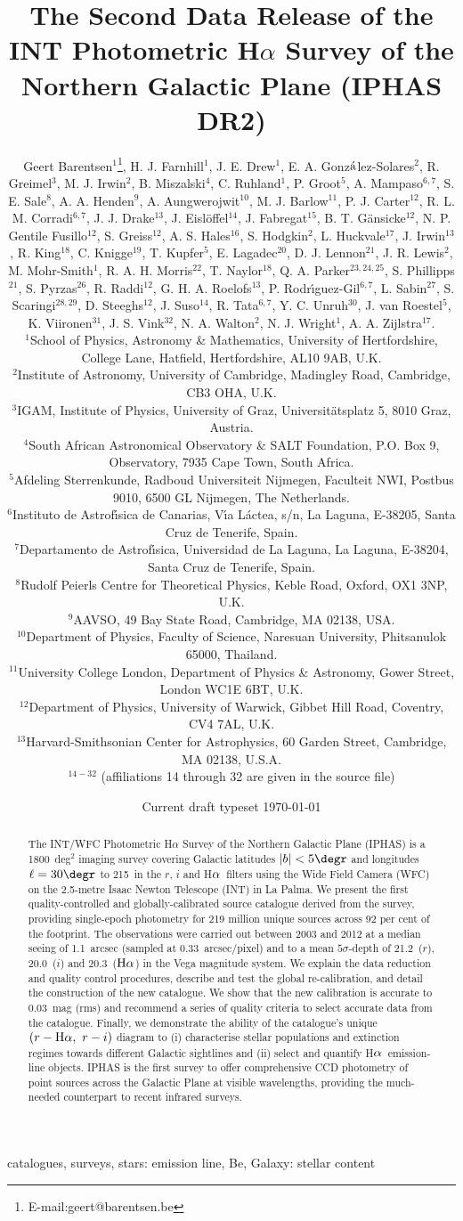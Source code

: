 \documentclass[a4paper,useAMS,usenatbib]{mn2e}
\title[IPHAS Data Release 2]{The Second Data Release 
of the INT Photometric H$\alpha$ Survey 
of the Northern Galactic Plane (IPHAS DR2)}
\author[G. Barentsen
et. al]{Geert Barentsen$^{1}$\thanks{E-mail:geert@barentsen.be},
H. J. Farnhill$^1$,
J. E. Drew$^1$,
E. A. Gonz$\acute{\rm{a}}$lez-Solares$^2$, \newauthor
R. Greimel$^3$, 
M. J. Irwin$^2$,
B. Miszalski$^{4}$,
C. Ruhland$^1$,
P. Groot$^5$,
A. Mampaso$^{6,7}$, \newauthor
S. E. Sale$^8$, 
A. A. Henden$^9$,
A. Aungwerojwit$^{10}$,
M. J. Barlow$^{11}$,
P. J. Carter$^{12}$, \newauthor
R. L. M. Corradi$^{6,7}$, 
J. J. Drake$^{13}$, 
J. Eisl\"offel$^{14}$, 
J. Fabregat$^{15}$, 
B. T. G\"ansicke$^{12}$, \newauthor
N. P. Gentile Fusillo$^{12}$, 
S. Greiss$^{12}$, 
A. S. Hales$^{16}$, 
S. Hodgkin$^2$,
L. Huckvale$^{17}$, \newauthor
J. Irwin$^{13}$,
R. King$^{18}$,
C. Knigge$^{19}$, 
T. Kupfer$^{5}$,
E. Lagadec$^{20}$,
D. J. Lennon$^{21}$, \newauthor
J. R. Lewis$^{2}$,
M. Mohr-Smith$^{1}$,
R. A. H. Morris$^{22}$, 
T. Naylor$^{18}$, 
Q. A. Parker$^{23,24,25}$,  \newauthor
S. Phillipps$^{21}$, 
S. Pyrzas$^{26}$,
R. Raddi$^{12}$,
G. H. A. Roelofs$^{13}$, 
P. Rodr\'\i guez-Gil$^{6,7}$, \newauthor
L. Sabin$^{27}$, 
S. Scaringi$^{28,29}$,
D. Steeghs$^{12}$,
J. Suso$^{14}$,
R. Tata$^{6,7}$,
Y. C. Unruh$^{30}$, \newauthor
J. van Roestel$^5$, 
K. Viironen$^{31}$, 
J. S. Vink$^{32}$, 
N. A. Walton$^{2}$, 
N. J. Wright$^{1}$, \newauthor
A. A. Zijlstra$^{17}$.
\\
$^{1}$School of Physics, Astronomy \& Mathematics, University of Hertfordshire, College Lane, Hatfield, Hertfordshire, AL10 9AB, U.K.\\
$^{2}$Institute of Astronomy, University of Cambridge, Madingley Road, Cambridge, CB3 OHA, U.K.\\
$^{3}$IGAM, Institute of Physics, University of Graz, Universit\"atsplatz 5, 8010 Graz, Austria.\\
$^{4}$South African Astronomical Observatory \& SALT Foundation, P.O. Box 9, Observatory, 7935 Cape Town, South Africa.\\
$^{5}$Afdeling Sterrenkunde, Radboud Universiteit Nijmegen, Faculteit NWI, Postbus 9010, 6500 GL Nijmegen, The Netherlands.\\
$^{6}$Instituto de Astrof\'\i sica de Canarias, V\'\i a L\'actea, s/n, La Laguna, E-38205, Santa Cruz de Tenerife, Spain.\\
$^{7}$Departamento de Astrof\'\i sica, Universidad de La Laguna, La Laguna, E-38204, Santa Cruz de Tenerife, Spain.\\
$^{8}$Rudolf Peierls Centre for Theoretical Physics, Keble Road, Oxford, OX1 3NP, U.K.\\
$^{9}$AAVSO, 49 Bay State Road, Cambridge, MA 02138, USA.\\
$^{10}$Department of Physics, Faculty of Science, Naresuan University, Phitsanulok 65000, Thailand.\\
$^{11}$University College London, Department of Physics \& Astronomy, 
Gower Street, London WC1E 6BT, U.K.\\
$^{12}$Department of Physics, University of Warwick, Gibbet Hill Road, Coventry, CV4 7AL, U.K.\\
$^{13}$Harvard-Smithsonian Center for Astrophysics, 60 Garden Street, 
Cambridge, MA 02138, U.S.A. \\
$^{14-32}$ (affiliations 14 through 32 are given in the source file)
}
\def\ha{\mbox{H$\rm \alpha$}}
\begin{document}
\date{Current draft typeset \today}
\pagerange{\pageref{firstpage}--\pageref{lastpage}} 
\maketitle

\label{firstpage}

\begin{abstract}
The INT/WFC Photometric H$\alpha$ Survey 
of the Northern Galactic Plane (IPHAS)
is a 1800~deg$^2$ imaging survey
covering Galactic latitudes $|b| < 5\degr$
and longitudes $\ell=30\degr$ to 215\degr\ 
in the $r$, $i$ and \ha\ filters 
using the Wide Field Camera (WFC) 
on the 2.5-metre Isaac Newton Telescope (INT) in La Palma.
We present the first quality-controlled and
globally-calibrated source catalogue
derived from the survey,
providing single-epoch photometry
for 219 million unique sources
across 92 per cent of the footprint.
The observations were carried out between 2003 and 2012
at a median seeing of 1.1~arcsec (sampled at 0.33~arcsec/pixel)
and to a mean $5\sigma$-depth of 
21.2~($r$), 20.0~($i$) and 20.3~($\ha$)
in the Vega magnitude system.
We explain the data reduction 
and quality control procedures,
describe and test the global re-calibration,
and detail the construction of the new catalogue.
We show that the new calibration is accurate to
0.03~mag (rms) 
and recommend a series of quality criteria
to select accurate data
from the catalogue.
Finally, we demonstrate the ability of the 
catalogue's unique
$(r-\ha,\ r-i)$ diagram to
(i) characterise stellar populations and extinction regimes
towards different Galactic sightlines
and (ii) select and quantify \ha\ emission-line objects.
IPHAS is the first survey to offer comprehensive CCD photometry
of point sources across the Galactic Plane at visible wavelengths,
providing the much-needed counterpart
to recent infrared surveys.
\end{abstract}

\begin{keywords}
catalogues, surveys, stars: emission line, Be, Galaxy: stellar content
\end{keywords}
\end{document}
